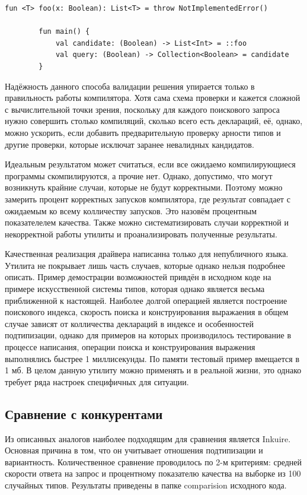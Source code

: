 \documentclass[times]{itmo-student-thesis}
\begin{document}
	\begin{lstlisting}[caption={Пример кода, который не скомпилируется},label={validation_scheme}]
		fun <T> foo(x: Boolean): List<T> = throw NotImplementedError()
		
		fun main() {
			val candidate: (Boolean) -> List<Int> = ::foo
			val query: (Boolean) -> Collection<Boolean> = candidate
		}
	\end{lstlisting}
	
	Надёжность данного способа валидации решения упирается только в правильность работы компилятора. Хотя сама схема проверки и кажется сложной с вычислительной точки зрения, поскольку для каждого поискового запроса нужно совершить столько компиляций, сколько всего есть деклараций, её, однако, можно ускорить, если добавить предварительную проверку арности типов и другие проверки, которые исключат заранее невалидных кандидатов.
	
	Идеальным результатом может считаться, если все ожидаемо компилирующиеся программы скомпилируются, а прочие нет. Однако, допустимо, что могут возникнуть крайние случаи, которые не будут корректными. Поэтому можно замерить процент корректных запусков компилятора, где результат совпадает с ожидаемым ко всему колличеству запусков. Это назовём процентным показателелем качества. Также можно систематизировать случаи корректной и некорректной работы утилиты и проанализировать полученные результаты.
	
	Качественная реализация драйвера написанна только для непубличного языка. Утилита не покрывает лишь часть случаев, которые однако нельзя подробнее описать. Пример демострации возможностей привдён в исходном коде на примере искусственной системы типов, которая однако является весьма приближенной к настоящей. Наиболее долгой операцией является построение поискового индекса, скорость поиска и конструирования выражаения в общем случае зависят от колличества деклараций в индексе и особенностей подтипизации, однако для примеров на которых производилось тестирование в процессе написания, операции поиска и конструирования выражения выполнялись быстрее 1 миллисекунды. По памяти тестовый пример вмещается в 1 мб. В целом данную утилиту можно применять и в реальной жизни, это однако требует ряда настроек специфичных для ситуации.
	
	\subsection{Сравнение с конкурентами}
	Из описанных аналогов наиболее подходящим для сравнения является Inkuire. Основная причина в том, что он учитывает отношения подтипизации и вариантность. Количественное сравнение проводилось по 2-м критериям: средней скорости ответа на запрос и процентному показателю качества на выборке из 100 случайных типов. Результаты приведены в папке comparision исходного кода.
	
\end{document}
